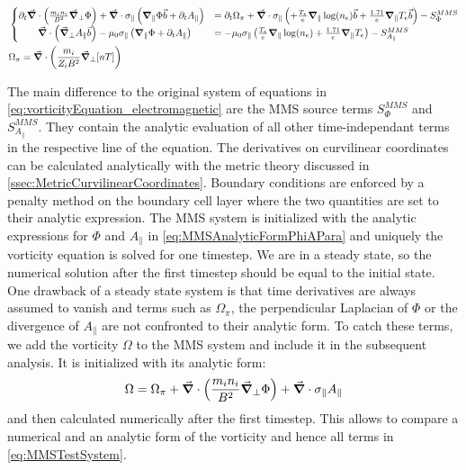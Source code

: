 \begin{align}
	&\begin{cases}
		\partial_t\vec{\grad}\cdot\left(\frac{m_in_i}{B^2}\vec{\grad}_\perp\Phi\right) + \vec{\grad}\cdot\sigma_\parallel \left(\grad_\parallel\Phi\vec{b}+\partial_t A_\parallel\right) &= \partial_t \Omega_\pi + \vec{\grad}\cdot\sigma_\parallel\left( + \frac{T_e}{e}\grad_\parallel \log(n_e)\vec{b} + \frac{1.71}{e}\grad_\parallel T_e\vec{b}\right)  - S^{MMS}_\Phi \\
		\qquad \vec{\grad}\cdot\left(\vec{\grad}_\perp A_\parallel\vec{b}\right) - \mu_0 \sigma_\parallel \left( \grad_\parallel \Phi + \partial_t A_\parallel\right)&= -\mu_0 \sigma_\parallel \left(\frac{T_e}{e}\grad_\parallel \log(n_e) + \frac{1.71}{e}\grad_\parallel T_e\right) - S^{MMS}_{A_\parallel}
	\end{cases} \nonumber \\
	&\Omega_\pi = \vec{\grad}\cdot\left(\frac{m_i}{Z_iB^2}\vec{\grad}_\perp[nT]\right)
	\label{eq:MMSTestSystem}
\end{align}

The main difference to the original system of equations in \autoref{eq:vorticityEquation_electromagnetic} are the MMS source terms $S^{MMS}_\Phi$ and $S^{MMS}_{A_\parallel}$. They contain the analytic evaluation of all other time-independant terms in the respective line of the equation. The derivatives on curvilinear coordinates can be calculated analytically with the metric theory discussed in \autoref{ssec:MetricCurvilinearCoordinates}. Boundary conditions are enforced by a penalty method on the boundary cell layer where the two quantities are set to their analytic expression. The MMS system is initialized with the analytic expressions for $\Phi$ and $A_\parallel$ in \autoref{eq:MMSAnalyticFormPhiAPara} and uniquely the vorticity equation is solved for one timestep. We are in a steady state, so the numerical solution after the first timestep should be equal to the initial state. \\
One drawback of a steady state system is that time derivatives are always assumed to vanish and terms such as $\Omega_\pi$, the perpendicular Laplacian of $\Phi$ or the divergence of $A_\parallel$ are not confronted to their analytic form. To catch these terms, we add the vorticity $\Omega$ to the MMS system and include it in the subsequent analysis. It is initialized with its analytic form:
$$ \Omega = \Omega_\pi + \vec{\grad}\cdot\left(\frac{m_in_i}{B^2}\vec{\grad}_\perp\Phi\right) + \vec{\grad}\cdot\sigma_\parallel A_\parallel $$
and then calculated numerically after the first timestep. This allows to compare a numerical and an analytic form of the vorticity and hence all terms in \autoref{eq:MMSTestSystem}.

